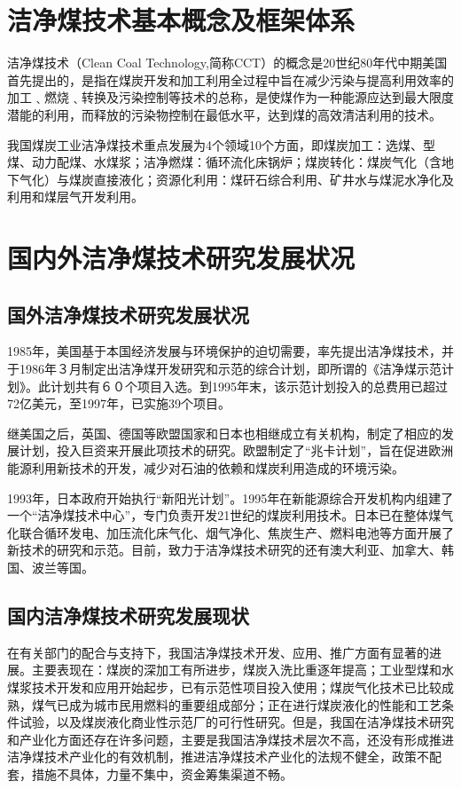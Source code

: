 \documentclass[10pt,openany]{ctexbook}
\begin{document}
\section{洁净煤技术基本概念及框架体系}
洁净煤技术（Clean Coal Technology,简称CCT）的概念是20世纪80年代中期美国首先提出的，是指在煤炭开发和加工利用全过程中旨在减少污染与提高利用效率的加工﹑燃烧﹑转换及污染控制等技术的总称，是使煤作为一种能源应达到最大限度潜能的利用，而释放的污染物控制在最低水平，达到煤的高效清洁利用的技术。\par
  我国煤炭工业洁净煤技术重点发展为4个领域10个方面，即煤炭加工：选煤、型煤、动力配煤、水煤浆；洁净燃煤：循环流化床锅炉；煤炭转化：煤炭气化（含地下气化）与煤炭直接液化；资源化利用：煤矸石综合利用、矿井水与煤泥水净化及利用和煤层气开发利用。
\section{国内外洁净煤技术研究发展状况}
\subsection{国外洁净煤技术研究发展状况}
1985年，美国基于本国经济发展与环境保护的迫切需要，率先提出洁净煤技术，并于1986年３月制定出洁净煤开发研究和示范的综合计划，即所谓的《洁净煤示范计划》。此计划共有６０个项目入选。到1995年末，该示范计划投入的总费用已超过72亿美元，至1997年，已实施39个项目。\par
  继美国之后，英国、德国等欧盟国家和日本也相继成立有关机构，制定了相应的发展计划，投入巨资来开展此项技术的研究。欧盟制定了“兆卡计划”，旨在促进欧洲能源利用新技术的开发，减少对石油的依赖和煤炭利用造成的环境污染。\par
  1993年，日本政府开始执行“新阳光计划”。1995年在新能源综合开发机构内组建了一个“洁净煤技术中心”，专门负责开发21世纪的煤炭利用技术。日本已在整体煤气化联合循环发电、加压流化床气化、烟气净化、焦炭生产、燃料电池等方面开展了新技术的研究和示范。目前，致力于洁净煤技术研究的还有澳大利亚、加拿大、韩国、波兰等国。\par
\subsection{国内洁净煤技术研究发展现状}
在有关部门的配合与支持下，我国洁净煤技术开发、应用、推广方面有显著的进展。主要表现在：煤炭的深加工有所进步，煤炭入洗比重逐年提高；工业型煤和水煤浆技术开发和应用开始起步，已有示范性项目投入使用；煤炭气化技术已比较成熟，煤气已成为城市民用燃料的重要组成部分；正在进行煤炭液化的性能和工艺条件试验，以及煤炭液化商业性示范厂的可行性研究。但是，我国在洁净煤技术研究和产业化方面还存在许多问题，主要是我国洁净煤技术层次不高，还没有形成推进洁净煤技术产业化的有效机制，推进洁净煤技术产业化的法规不健全，政策不配套，措施不具体，力量不集中，资金筹集渠道不畅。
\end{document}
